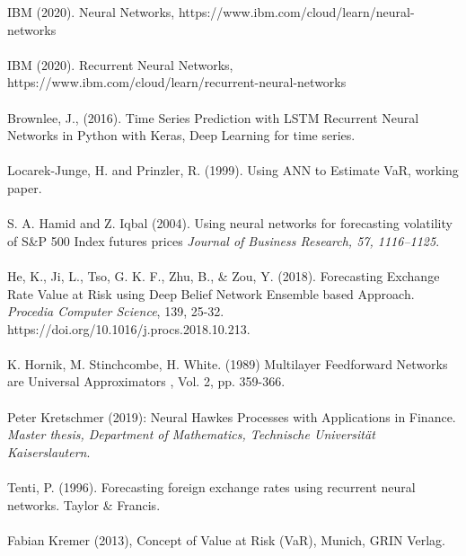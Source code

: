 \documentclass[a4paper,11pt,oneside]{book}
\begin{document}
IBM (2020). Neural Networks, https://www.ibm.com/cloud/learn/neural-networks\\\\
IBM (2020). Recurrent Neural Networks, https://www.ibm.com/cloud/learn/recurrent-neural-networks\\\\
Brownlee, J., (2016). Time Series Prediction with LSTM Recurrent Neural Networks
in Python with Keras, Deep Learning for time series.\\\\
Locarek-Junge, H. and Prinzler, R. (1999). Using ANN to Estimate VaR, working
paper.\\\\
S. A. Hamid and Z. Iqbal (2004). Using neural networks for forecasting volatility of S\&P 500 Index futures prices \textit{Journal of Business Research,  57, 1116–1125}.\\\\
He, K., Ji, L., Tso, G. K. F., Zhu, B., \& Zou, Y. (2018). Forecasting Exchange Rate Value at Risk using Deep Belief Network Ensemble based Approach. \textit{Procedia Computer Science}, 139, 25-32.
https://doi.org/10.1016/j.procs.2018.10.213.\\\\
K. Hornik, M. Stinchcombe, H. White. (1989) Multilayer Feedforward Networks are Universal Approximators , Vol. 2, pp. 359-366.\\\\
Peter Kretschmer (2019): Neural Hawkes Processes with Applications
in Finance. \textit{Master thesis, Department of Mathematics, Technische Universität Kaiserslautern}.\\\\
Tenti, P. (1996). Forecasting foreign exchange rates using recurrent neural networks. Taylor \& Francis.\\\\
Fabian Kremer (2013), Concept of Value at Risk (VaR), Munich, GRIN Verlag.



\listoffigures
\listoftables
\end{document}
